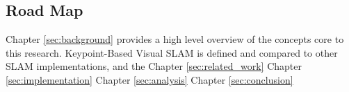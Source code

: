 \subsection{Road Map}

Chapter \ref{sec:background} provides a high level overview of the concepts core to this research. Keypoint-Based Visual SLAM is defined and compared to other SLAM implementations, and the 
Chapter \ref{sec:related_work}
Chapter \ref{sec:implementation}
Chapter \ref{sec:analysis}
Chapter \ref{sec:conclusion}
